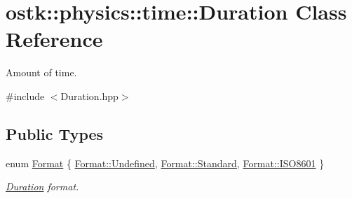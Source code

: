 \hypertarget{classostk_1_1physics_1_1time_1_1_duration}{}\section{ostk\+:\+:physics\+:\+:time\+:\+:Duration Class Reference}
\label{classostk_1_1physics_1_1time_1_1_duration}


Amount of time.  




{\ttfamily \#include $<$Duration.\+hpp$>$}

\subsection*{Public Types}
\begin{DoxyCompactItemize}
\item 
enum \hyperlink{classostk_1_1physics_1_1time_1_1_duration_a4bf616b67d15e0fbc4beb4fcc306c368}{Format} \{ \hyperlink{classostk_1_1physics_1_1time_1_1_duration_a4bf616b67d15e0fbc4beb4fcc306c368aec0fc0100c4fc1ce4eea230c3dc10360}{Format\+::\+Undefined}, 
\hyperlink{classostk_1_1physics_1_1time_1_1_duration_a4bf616b67d15e0fbc4beb4fcc306c368aeb6d8ae6f20283755b339c0dc273988b}{Format\+::\+Standard}, 
\hyperlink{classostk_1_1physics_1_1time_1_1_duration_a4bf616b67d15e0fbc4beb4fcc306c368a35b6786739efcdc5a74ab1dca29d3b6b}{Format\+::\+I\+S\+O8601}
 \}\begin{DoxyCompactList}\small\item\em \hyperlink{classostk_1_1physics_1_1time_1_1_duration}{Duration} format. \end{DoxyCompactList}
\end{DoxyCompactItemize}

